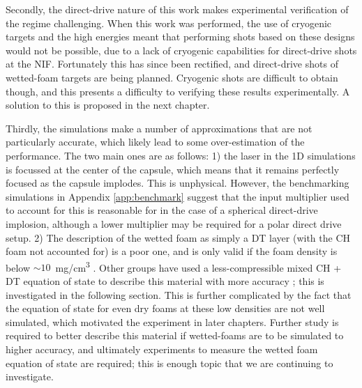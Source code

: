 Secondly, the direct-drive nature of this work makes experimental verification of the regime challenging. When this work was performed, the use of cryogenic targets and the high energies meant that performing shots based on these designs would not be possible, due to a lack of cryogenic capabilities for direct-drive shots at the NIF. Fortunately this has since been rectified, and direct-drive shots of wetted-foam targets are being planned. Cryogenic shots are difficult to obtain though, and this presents a difficulty to verifying these results experimentally. A solution to this is proposed in the next chapter.

Thirdly, the simulations make a number of approximations that are not particularly accurate, which likely lead to some over-estimation of the performance. The two main ones are as follows: 1) the laser in the 1D simulations is focussed at the center of the capsule, which means that it remains perfectly focused as the capsule implodes. This is unphysical. However, the benchmarking simulations in Appendix \ref{app:benchmark} suggest that the input multiplier used to account for this is reasonable for in the case of a spherical direct-drive implosion, although a lower multiplier may be required for a polar direct drive setup. 2) The description of the wetted foam as simply a DT layer (with the CH foam not accounted for) is a poor one, and is only valid if the foam density is below $\sim10$~\si[per-mode=symbol]{\milli\gram\per\centi\meter\cubed} \cite{CHFoamLim}. Other groups have used a less-compressible mixed CH + DT equation of state to describe this material with more accuracy \cite{Olson2021}; this is investigated in the following section. This is further complicated by the fact that the equation of state for even dry foams at these low densities are not well simulated, which motivated the experiment in later chapters. Further study is required to better describe this material if wetted-foams are to be simulated to higher accuracy, and ultimately experiments to measure the wetted foam equation of state are required; this is enough topic that we are continuing to investigate.

